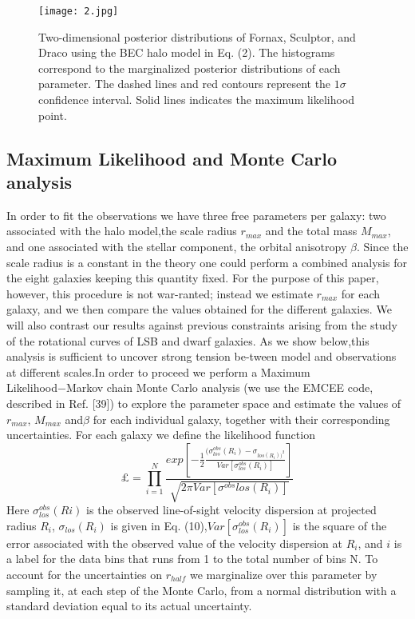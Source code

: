 \documentclass{article}
\begin{document}
\begin{figure}[h]
\centering
\texttt{[image: 2.jpg]}
\caption{\label{fig:1}Two-dimensional posterior distributions of Fornax, Sculptor, and Draco using the BEC halo model in Eq. (2).  The histograms  correspond  to  the  marginalized  posterior  distributions  of  each  parameter.   The  dashed  lines  and  red  contours represent the $1\sigma$ confidence interval.  Solid lines indicates the maximum likelihood point.}
\end{figure}
\begin{multicols}{2}
\subsection{Maximum Likelihood and Monte Carlo analysis}
In order to fit the observations we have three free parameters per galaxy: two associated with the halo model,the  scale  radius $r_{max}$ and  the  total  mass $M_{max}$,  and one  associated  with  the  stellar  component,  the  orbital anisotropy $\beta$.  Since the scale radius is a constant in the theory  one  could  perform  a  combined  analysis  for  the eight galaxies keeping this quantity fixed.  For the purpose of this paper,  however,  this procedure is not war-ranted;  instead  we  estimate $r_{max}$ for  each  galaxy,  and we  then  compare  the  values  obtained  for  the  different galaxies.  We will also contrast our results against previous constraints arising from the study of the rotational curves  of  LSB  and  dwarf  galaxies.   As  we  show  below,this  analysis  is  sufficient  to  uncover  strong  tension  be-tween model and observations at different scales.In   order   to   proceed   we   perform   a   Maximum Likelihood−Markov chain Monte Carlo analysis (we use the EMCEE code, described in Ref. [39]) to explore the parameter space and estimate the values of $r_{max}$, $M_{max}$ and$\beta$ for each individual galaxy, together with their corresponding uncertainties.  For each galaxy we define the likelihood function
\begin{equation}
\pounds={\prod_{i=1}^{N}{\frac{exp\left[-{\frac{1}{2}}{\frac{(\sigma^{obs}_{los}(R_i)-\sigma_{los(R_i))^2}}{Var[\sigma^{obs}_{los}(R_i)]}} \right]}{\sqrt{2\pi Var[\sigma^{obs}{los}(R_i)]}}}}  
\end{equation}
Here $\sigma^{obs}_{los}(Ri)$ is the observed line-of-sight velocity dispersion at projected radius $R_i$, $\sigma_{los}(R_i)$ is given in Eq. (10),$Var[\sigma^{obs}_{los}(R_i)]$ is the square of the error associated with the observed value of the velocity dispersion at $R_i$, and $i$ is a label for the data bins that runs from 1 to the total number of bins N.  To account for the uncertainties on $r_{half}$ we marginalize over this parameter by sampling it, at each step of the Monte Carlo, from a normal distribution  with  a  standard  deviation  equal  to  its  actual uncertainty.

\end{multicols}
\end{document}
